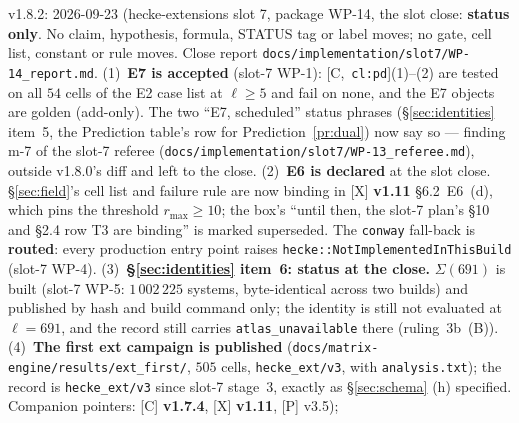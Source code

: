 \documentclass[11pt]{article}
\theoremstyle{remark}
\newcommand{\HA}[1]{[C,~\texttt{#1}]}      %
\begin{document}
v1.8.2: 2026-09-23 (hecke-extensions slot 7, package WP-14, the slot close:
\textbf{status only}. No claim, hypothesis, formula, STATUS tag or label moves; no gate, cell
list, constant or rule moves. Close report \texttt{docs/implementation/slot7/WP-14\_report.md}.
(1)~\textbf{E7 is accepted} (slot-7 WP-1): \HA{cl:pd}(1)--(2) are tested on all $54$ cells of
the E2 case list at $\ell\ge5$ and fail on none, and the E7 objects are golden (add-only). The
two ``E7, scheduled'' status phrases (\S\ref{sec:identities} item~5, the Prediction table's
row for Prediction~\ref{pr:dual}) now say so --- finding m-7 of the slot-7 referee
(\texttt{docs/implementation/slot7/WP-13\_referee.md}), outside v1.8.0's diff and left to the close.
(2)~\textbf{E6 is declared} at the slot close. \S\ref{sec:field}'s cell list and failure rule
are now binding in [X] \textbf{v1.11} \S6.2~E6~(d), which pins the threshold $r_{\max}\ge10$;
the box's ``until then, the slot-7 plan's \S10 and \S2.4 row T3 are binding'' is marked
superseded. The \texttt{conway} fall-back is \textbf{routed}: every production entry point
raises \texttt{hecke::NotImplementedInThisBuild} (slot-7 WP-4).
(3)~\textbf{\S\ref{sec:identities} item~6: status at the close.} $\Sigma(691)$ is built (slot-7
WP-5: $1\,002\,225$ systems, byte-identical across two builds) and published by hash and build
command only; the identity is still not evaluated at $\ell=691$, and the record still carries
\texttt{atlas\_unavailable} there (ruling~3b~(B)).
(4)~\textbf{The first ext campaign is published} (\texttt{docs/matrix-engine/results/ext\_first/},
$505$ cells, \texttt{hecke\_ext/v3}, with \texttt{analysis.txt}); the record is
\texttt{hecke\_ext/v3} since slot-7 stage~3, exactly as \S\ref{sec:schema} (h) specified.
Companion pointers: [C] \textbf{v1.7.4}, [X] \textbf{v1.11}, [P] v3.5);
\end{document}
